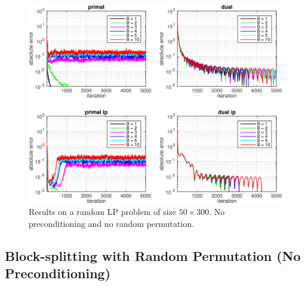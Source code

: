 \documentclass{article}
\begin{document}
{\begin{figure}[h]
	\includegraphics[width=\textwidth]{../figures/noprecond_norndperm.png}
	\caption{Results on a random LP problem of size $50 \times 300$. No preconditioning and no random permutation.}
	\label{fig:nop_nor}
\end{figure}
\newpage
\subsection*{Block-splitting with Random Permutation (No Preconditioning)}

}
\end{document}
